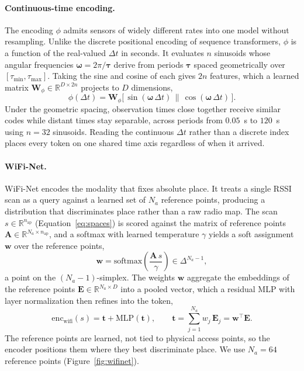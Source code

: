 \paragraph{Continuous-time encoding.}
The encoding $\phi$ admits sensors of widely different rates into one model
without resampling. Unlike the discrete positional encoding of sequence
transformers, $\phi$ is a function of the real-valued $\Delta t$ in seconds. It
evaluates $n$ sinusoids whose angular frequencies $\boldsymbol{\omega} =
2\pi/\boldsymbol{\tau}$ derive from periods $\boldsymbol{\tau}$ spaced
geometrically over $[\tau_{\min},\tau_{\max}]$. Taking the sine and cosine of
each gives $2n$ features, which a learned matrix
$\mathbf{W}_\phi \in \mathbb{R}^{D \times 2n}$ projects to $D$ dimensions,
\begin{equation}\label{eq:time}
  \phi(\Delta t) = \mathbf{W}_\phi
    \big[\, \sin(\boldsymbol{\omega}\,\Delta t) \,\|\,
            \cos(\boldsymbol{\omega}\,\Delta t) \,\big].
\end{equation}
Under the geometric spacing, observation times close together receive similar
codes while distant times stay separable, across periods from $0.05$~s to
$120$~s using $n=32$ sinusoids. Reading the continuous $\Delta t$ rather than a
discrete index places every token on one shared time axis regardless of when it
arrived.

\paragraph{WiFi-Net.}
WiFi-Net encodes the modality that fixes absolute place. It treats a single RSSI
scan as a query against a learned set of $N_a$ reference points, producing a
distribution that discriminates place rather than a raw radio map. The scan
$s \in \mathbb{R}^{n_{\mathrm{ap}}}$ (Equation~\eqref{eq:spaces}) is scored against
the matrix of reference points $\mathbf{A} \in \mathbb{R}^{N_a \times n_{\mathrm{ap}}}$,
and a softmax with learned temperature $\gamma$ yields a soft assignment
$\mathbf{w}$ over the reference points,
\begin{equation}\label{eq:wifi_assign}
  \mathbf{w} = \mathrm{softmax}\!\left( \frac{\mathbf{A}\, s}{\gamma} \right)
            \in \Delta^{N_a-1},
\end{equation}
a point on the $(N_a{-}1)$-simplex. The weights $\mathbf{w}$ aggregate the
embeddings of the reference points $\mathbf{E} \in \mathbb{R}^{N_a \times D}$ into
a pooled vector, which a residual MLP with layer normalization then refines into
the token,
\begin{equation}\label{eq:wifi_token}
  \mathrm{enc}_{\mathrm{wifi}}(s) = \mathbf{t} + \mathrm{MLP}(\mathbf{t}),
  \qquad
  \mathbf{t} = \sum_{j=1}^{N_a} w_j\, \mathbf{E}_j = \mathbf{w}^{\!\top}\mathbf{E}.
\end{equation}
The reference points are learned, not tied to physical access points, so the
encoder positions them where they best discriminate place. We use $N_a=64$
reference points (Figure~\ref{fig:wifinet}).

